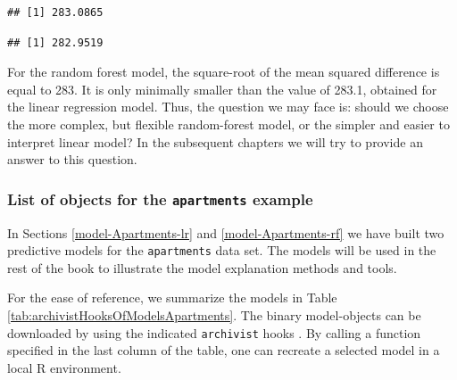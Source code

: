 \documentclass[12pt,]{krantz}
\newenvironment{Shaded}{\begin{snugshade}}{\end{snugshade}}
\newcommand{\DecValTok}[1]{\textcolor[rgb]{0.00,0.00,0.81}{#1}}
\newcommand{\KeywordTok}[1]{\textcolor[rgb]{0.13,0.29,0.53}{\textbf{#1}}}
\newcommand{\NormalTok}[1]{#1}
\newcommand{\OperatorTok}[1]{\textcolor[rgb]{0.81,0.36,0.00}{\textbf{#1}}}
\newcommand{\StringTok}[1]{\textcolor[rgb]{0.31,0.60,0.02}{#1}}
\begin{document}
\begin{verbatim}
## [1] 283.0865
\end{verbatim}

\begin{Shaded}
\end{Shaded}

\begin{verbatim}
## [1] 282.9519
\end{verbatim}

For the random forest model, the square-root of the mean squared difference is equal to 283. It is only minimally smaller than the value of 283.1, obtained for the linear regression model. Thus, the question we may face is: should we choose the more complex, but flexible random-forest model, or the simpler and easier to interpret linear model? In the subsequent chapters we will try to provide an answer to this question.

\hypertarget{ListOfModelsApartments}{%
\subsubsection{\texorpdfstring{List of objects for the \texttt{apartments} example}{List of objects for the apartments example}}\label{ListOfModelsApartments}}

In Sections \ref{model-Apartments-lr} and \ref{model-Apartments-rf} we have built two predictive models for the \texttt{apartments} data set. The models will be used in the rest of the book to illustrate the model explanation methods and tools.

For the ease of reference, we summarize the models in Table \ref{tab:archivistHooksOfModelsApartments}. The binary model-objects can be downloaded by using the indicated \texttt{archivist} hooks \citep{archivist}. By calling a function specified in the last column of the table, one can recreate a selected model in a local R environment.
\end{document}
